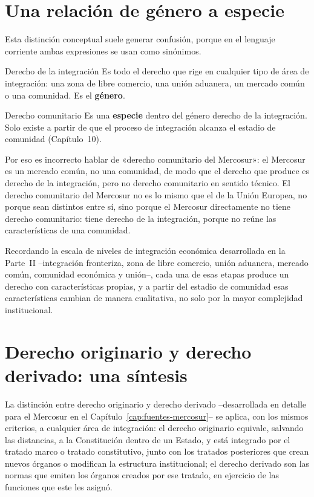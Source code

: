 \documentclass[12pt,oneside]{book}
\begin{document}
\section{Una relación de género a especie}

Esta distinción conceptual suele generar confusión, porque en el lenguaje corriente ambas expresiones se usan como sinónimos.

\begin{definicion}{Derecho de la integración}
Es todo el derecho que rige en cualquier tipo de área de integración: una zona de libre comercio, una unión aduanera, un mercado común o una comunidad. Es el \textbf{género}.
\end{definicion}

\begin{definicion}{Derecho comunitario}
Es una \textbf{especie} dentro del género derecho de la integración. Solo existe a partir de que el proceso de integración alcanza el estadio de comunidad (Capítulo~10).
\end{definicion}

Por eso es incorrecto hablar de «derecho comunitario del Mercosur»: el Mercosur es un mercado común, no una comunidad, de modo que el derecho que produce es derecho de la integración, pero no derecho comunitario en sentido técnico. El derecho comunitario del Mercosur no es lo mismo que el de la Unión Europea, no porque sean distintos entre sí, sino porque el Mercosur directamente no tiene derecho comunitario: tiene derecho de la integración, porque no reúne las características de una comunidad.

Recordando la escala de niveles de integración económica desarrollada en la Parte~II --integración fronteriza, zona de libre comercio, unión aduanera, mercado común, comunidad económica y unión--, cada una de esas etapas produce un derecho con características propias, y a partir del estadio de comunidad esas características cambian de manera cualitativa, no solo por la mayor complejidad institucional.

\section{Derecho originario y derecho derivado: una síntesis}

La distinción entre derecho originario y derecho derivado --desarrollada en detalle para el Mercosur en el Capítulo~\ref{cap:fuentes-mercosur}-- se aplica, con los mismos criterios, a cualquier área de integración: el derecho originario equivale, salvando las distancias, a la Constitución dentro de un Estado, y está integrado por el tratado marco o tratado constitutivo, junto con los tratados posteriores que crean nuevos órganos o modifican la estructura institucional; el derecho derivado son las normas que emiten los órganos creados por ese tratado, en ejercicio de las funciones que este les asignó.
\end{document}
